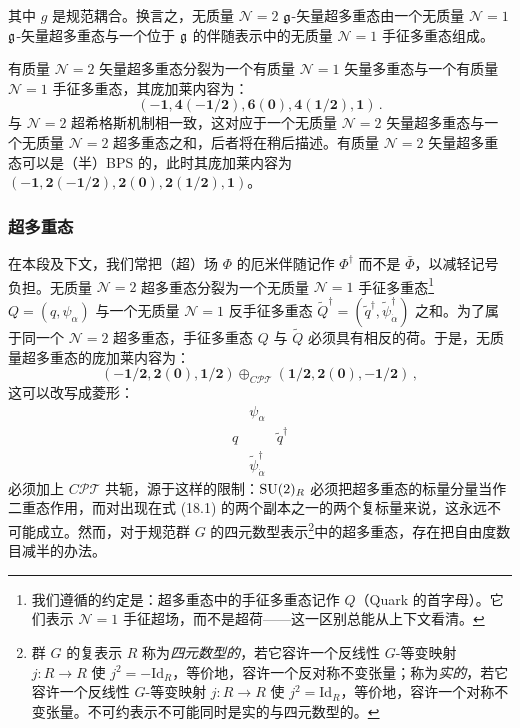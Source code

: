 其中 $g$ 是规范耦合。换言之，无质量 $\mathcal N=2$ $\mathfrak{g}$-矢量超多重态由一个无质量 $\mathcal N=1$ $\mathfrak{g}$-矢量超多重态与一个位于 $\mathfrak{g}$ 的伴随表示中的无质量 $\mathcal N=1$ 手征多重态组成。

有质量 $\mathcal N=2$ 矢量超多重态分裂为一个有质量 $\mathcal N=1$ 矢量多重态与一个有质量 $\mathcal N=1$ 手征多重态，其庞加莱内容为：
\[
(\mathbf{-1},\mathbf{4}(\mathbf{-1/2}),\mathbf{6}(\mathbf{0}),\mathbf{4}(\mathbf{1/2}),\mathbf{1})\,.
\]
与 $\mathcal N=2$ 超希格斯机制相一致，这对应于一个无质量 $\mathcal N=2$ 矢量超多重态与一个无质量 $\mathcal N=2$ 超多重态之和，后者将在稍后描述。有质量 $\mathcal N=2$ 矢量超多重态可以是（半）BPS 的，此时其庞加莱内容为 $(\mathbf{-1},\mathbf{2}(\mathbf{-1/2}),\mathbf{2}(\mathbf{0}),\mathbf{2}(\mathbf{1/2}),\mathbf{1})$。

\subsubsection*{超多重态}

在本段及下文，我们常把（超）场 $\Phi$ 的厄米伴随记作 $\Phi^\dagger$ 而不是 $\bar\Phi$，以减轻记号负担。无质量 $\mathcal N=2$ 超多重态分裂为一个无质量 $\mathcal N=1$ 手征多重态\footnote{我们遵循的约定是：超多重态中的手征多重态记作 $Q$（Quark 的首字母）。它们表示 $\mathcal N=1$ 手征超场，而不是超荷——这一区别总能从上下文看清。} $Q=(q,\psi_\alpha)$ 与一个无质量 $\mathcal N=1$ 反手征多重态 $\tilde Q^\dagger=(\tilde q^\dagger,\tilde\psi^\dagger_{\dot\alpha})$ 之和。为了属于同一个 $\mathcal N=2$ 超多重态，手征多重态 $Q$ 与 $\tilde Q$ 必须具有相反的荷。于是，无质量超多重态的庞加莱内容为：
\begin{equation}
(\mathbf{-1/2},\mathbf{2}(\mathbf{0}),\mathbf{1/2})\oplus_{C\mathcal{PT}}(\mathbf{1/2},\mathbf{2}(\mathbf{0}),-\mathbf{1/2})\,, \tag{18.1}
\end{equation}
这可以改写成菱形：
\[
\begin{matrix}
& \psi_\alpha &\\[2pt]
q & & \tilde q^\dagger\\[2pt]
& \tilde\psi^\dagger_{\dot\alpha} &
\end{matrix}
\]
必须加上 $C\mathcal{PT}$ 共轭，源于这样的限制：$\operatorname{SU}(2)_R$ 必须把超多重态的标量分量当作二重态作用，而对出现在式 (18.1) 的两个副本之一的两个复标量来说，这永远不可能成立。然而，对于规范群 $G$ 的四元数型表示\footnote{群 $G$ 的复表示 $R$ 称为\emph{四元数型的}，若它容许一个反线性 $G$-等变映射 $j:R\to R$ 使 $j^2=-\mathrm{Id}_R$，等价地，容许一个反对称不变张量；称为\emph{实的}，若它容许一个反线性 $G$-等变映射 $j:R\to R$ 使 $j^2=\mathrm{Id}_R$，等价地，容许一个对称不变张量。不可约表示不可能同时是实的与四元数型的。}中的超多重态，存在把自由度数目减半的办法。

